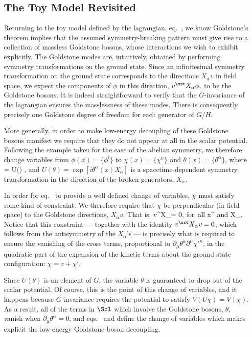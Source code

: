 \documentclass[12pt]{report}
\begin{document}
\subsection{The Toy Model Revisited}

Returning to the toy model defined by the lagrangian,
eq.~, we know Goldstone's theorem 
implies that the assumed symmetry-breaking pattern
must give rise to a collection of massless Goldstone
bosons, whose interactions we wish to exhibit explicitly.
The Goldstone modes are, intuitively, obtained by
performing symmetry transformations on the ground state.
Since an infinitesimal symmetry transformation on the
ground state corresponds to the directions $X_\alpha v$ in
field space, we expect the components of $\phi$ in this
direction, $v^\sst X_\alpha \phi$, to be the Goldstone
bosons. It is indeed straightforward to verify that the
$G$-invariance of the lagrangian ensures the masslessness
of these modes. There is consequently precisely one
Goldstone degree of freedom for each generator of $G/H$.

More generally, in order to make low-energy decoupling of
these Goldstone bosons manifest we require that they do not
appear at all in the scalar potential. Following the example
taken for the case of the abelian symmetry, we therefore
change variables from 
$\phi(x) = \{ \phi^i\}$ to $\chi(x) = \{ \chi^n \}$ and
$\theta(x) = 
\{ \theta^\alpha \}$, where   
%
\eq
\label{nonabeldef}
\phi = U(\theta) \; \chi ,
\eeq
%
and $U(\theta) = \exp[ i \theta^\alpha(x) X_\alpha]$ is a
spacetime-dependent symmetry transformation in the
direction of the broken generators, $X_\alpha$. 

In order for eq.~ to provide a well
defined change of variables, $\chi$ must satisfy some kind
of constraint. We therefore require that $\chi$ be
perpendicular (in field space) to the Goldstone directions,
$X_\alpha v$. That is:
%
\eq
\label{chicond}
v^\sst X_\alpha \chi = 0, \qquad \hbox{for all} \; x^\mu \;
\hbox{and} \;
X_\alpha.
\eeq
%
Notice that this constraint --- together with the identity
$v^\sst 
X_\alpha v = 0$, which follows from the antisymmetry of the
$X_\alpha$'s --- is precisely what is required to ensure the
vanishing of the cross terms, proportional to $\partial_\mu 
\theta^\alpha \partial^\mu \chi'^n$, in the quadratic part
of the expansion of the kinetic terms about the ground
state configuration: $\chi = v + \chi'$.

Since $U(\theta)$ is an element of $G$, the variable 
$\theta$ is guaranteed to drop out of the scalar potential. 
Of course, this is the point of this change of variables,
and it happens because $G$-invariance requires the 
potential to satisfy $V(U \chi) = V(\chi)$. As a result, all 
of the terms in $\Scl$ which involve the Goldstone bosons, 
$\theta$, vanish when $\partial_\mu \theta^\alpha =0$, 
and eqs.~ and 
 define the change of variables which makes
explicit the low-energy Goldstone-boson decoupling.
\end{document}
